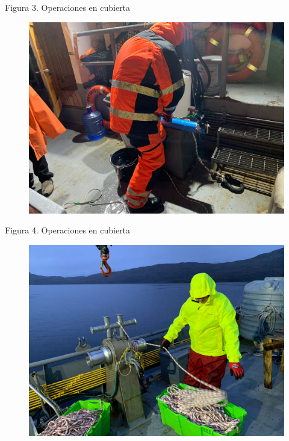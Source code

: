 \documentclass[
  letterpaper,
  DIV=11,
  numbers=noendperiod]{scrartcl}
\begin{document}
Figura 3. Operaciones en cubierta

\begin{figure}

{\centering \includegraphics[width=7.04167in,height=\textheight]{WhatsApp Image 2023-09-06 at 12.41.04.jpeg}

}

\end{figure}

Figura 4. Operaciones en cubierta

\begin{figure}

{\centering \includegraphics{WhatsApp Image 2023-09-06 at 12.41.05.jpeg}

}

\end{figure}
\end{document}
